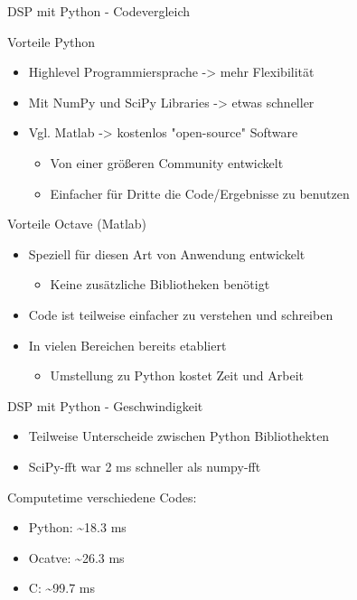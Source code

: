 \documentclass[8pt]{beamer}
\begin{document}
\begin{frame}[label={sec:org7a17036}]{DSP mit Python - Codevergleich}
\begin{block}{Vorteile Python}
\begin{itemize}
\item Highlevel Programmiersprache -> mehr Flexibilität
\item Mit NumPy und SciPy Libraries -> etwas schneller
\item Vgl. Matlab -> kostenlos "open-source" Software
\begin{itemize}
\item Von einer größeren Community entwickelt
\item Einfacher für Dritte die Code/Ergebnisse zu benutzen
\end{itemize}
\end{itemize}
\end{block}
\begin{block}{Vorteile Octave (Matlab)}
\begin{itemize}
\item Speziell für diesen Art von Anwendung entwickelt
\begin{itemize}
\item Keine zusätzliche Bibliotheken benötigt
\end{itemize}
\item Code ist teilweise einfacher zu verstehen und schreiben
\item In vielen Bereichen bereits etabliert
\begin{itemize}
\item Umstellung zu Python kostet Zeit und Arbeit
\end{itemize}
\end{itemize}
\end{block}
\end{frame}


\begin{frame}[label={sec:org8a102be}]{DSP mit Python - Geschwindigkeit}
\begin{itemize}
\item Teilweise Unterscheide zwischen Python Bibliothekten
\item SciPy-fft war 2 ms schneller als numpy-fft
\end{itemize}
\begin{block}{Computetime verschiedene Codes:}
\begin{itemize}
\item Python: \textasciitilde{}18.3 ms
\item Ocatve: \textasciitilde{}26.3 ms
\item C: \textasciitilde{}99.7 ms
\end{itemize}
\end{block}
\end{frame}
\end{document}
